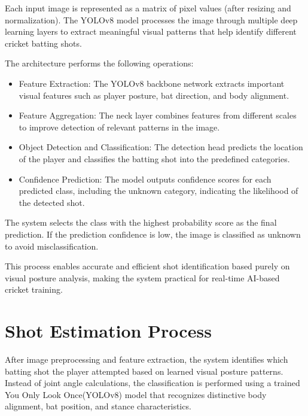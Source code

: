 Each input image is represented as a matrix of pixel values (after resizing and normalization). The YOLOv8 model processes the image through multiple deep learning layers to extract meaningful visual patterns that help identify different cricket batting shots.

The architecture performs the following operations:
\begin{itemize}
	\item Feature Extraction: The YOLOv8 backbone network extracts important visual features such as player posture, bat direction, and body alignment.
	\item Feature Aggregation: The neck layer combines features from different scales to improve detection of relevant patterns in the image.
	\item Object Detection and Classification: The detection head predicts the location of the player and classifies the batting shot into the predefined categories.
	\item Confidence Prediction: The model outputs confidence scores for each predicted class, including the unknown category, indicating the likelihood of the detected shot.
\end{itemize}
The system selects the class with the highest probability score as the final prediction. If the prediction confidence is low, the image is classified as unknown to avoid misclassification.

This process enables accurate and efficient shot identification based purely on visual posture analysis, making the system practical for real-time AI-based cricket training.

\section{Shot Estimation Process} \label{S4.6}
After image preprocessing and feature extraction, the system identifies which batting shot the player attempted based on learned visual posture patterns. Instead of joint angle calculations, the classification is performed using a trained You Only Look Once(YOLOv8) model that recognizes distinctive body alignment, bat position, and stance characteristics.

